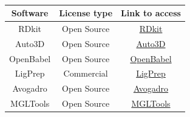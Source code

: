 \begin{table}[ht]
    \centering
    \caption{{\color{red}{List of Tools for Ligand preparation and format conversion}}}
    \label{tab:list2}
    \begin{tabular}{|c|c|c|}
    \hline
         \textbf{Software} & \textbf{License type} & \textbf{Link to access} \\
    \hline
        RDkit & Open Source & \href{https://github.com/rdkit/rdkit}{RDkit} \\
        Auto3D & Open Source & \href{https://github.com/isayevlab/Auto3D_pkg}{Auto3D}  \\
        OpenBabel & Open Source & \href{https://github.com/openbabel/openbabel}{OpenBabel}  \\
        LigPrep & Commercial & \href{https://www.schrodinger.com/platform/products/ligprep/}{LigPrep} \\
        Avogadro & Open Source & \href{https://avogadro.cc/}{Avogadro}  \\
        MGLTools & Open Source & \href{https://ccsb.scripps.edu/mgltools/downloads/}{MGLTools} \\
    \hline
    \end{tabular}
\end{table}

